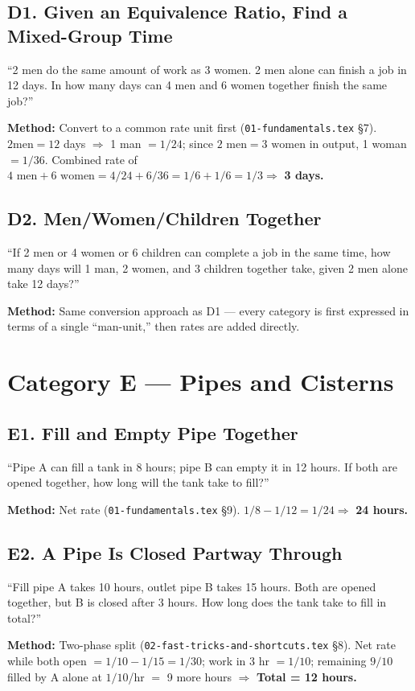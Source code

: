 \documentclass[11pt]{article}
\begin{document}
\subsection*{D1. Given an Equivalence Ratio, Find a Mixed-Group Time}
\begin{tipbox}[Phrasing]
``2 men do the same amount of work as 3 women. 2 men alone can finish a job in 12 days. In how many
days can 4 men and 6 women together finish the same job?''
\end{tipbox}
\textbf{Method:} Convert to a common rate unit first (\texttt{01-fundamentals.tex} \S7). $2\text{
men}=12$ days $\Rightarrow$ 1 man $=1/24$; since $2\text{ men}=3\text{ women}$ in output, 1 woman
$=1/36$. Combined rate of $4\text{ men}+6\text{ women} = 4/24+6/36 = 1/6+1/6 = 1/3 \Rightarrow$
\textbf{3 days.}

\subsection*{D2. Men/Women/Children Together}
\begin{tipbox}[Phrasing]
``If 2 men or 4 women or 6 children can complete a job in the same time, how many days will 1 man, 2
women, and 3 children together take, given 2 men alone take 12 days?''
\end{tipbox}
\textbf{Method:} Same conversion approach as D1 --- every category is first expressed in terms of a
single ``man-unit,'' then rates are added directly.

\section*{Category E --- Pipes and Cisterns}

\subsection*{E1. Fill and Empty Pipe Together}
\begin{tipbox}[Phrasing]
``Pipe A can fill a tank in 8 hours; pipe B can empty it in 12 hours. If both are opened together,
how long will the tank take to fill?''
\end{tipbox}
\textbf{Method:} Net rate (\texttt{01-fundamentals.tex} \S9). $1/8-1/12=1/24 \Rightarrow$
\textbf{24 hours.}

\subsection*{E2. A Pipe Is Closed Partway Through}
\begin{tipbox}[Phrasing]
``Fill pipe A takes 10 hours, outlet pipe B takes 15 hours. Both are opened together, but B is
closed after 3 hours. How long does the tank take to fill in total?''
\end{tipbox}
\textbf{Method:} Two-phase split (\texttt{02-fast-tricks-and-shortcuts.tex} \S8). Net rate while
both open $=1/10-1/15=1/30$; work in 3 hr $=1/10$; remaining $9/10$ filled by A alone at
$1/10$/hr $=$ 9 more hours $\Rightarrow$ \textbf{Total = 12 hours.}
\end{document}
